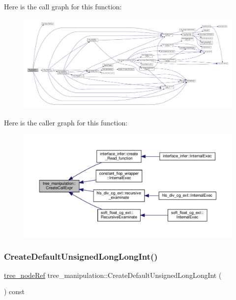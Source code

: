 Here is the call graph for this function\+:
\nopagebreak
\begin{figure}[H]
\begin{center}
\leavevmode
\includegraphics[width=350pt]{d0/d99/classtree__manipulation_aeb47755c334dbaf56f014949d98bcfda_cgraph}
\end{center}
\end{figure}
Here is the caller graph for this function\+:
\nopagebreak
\begin{figure}[H]
\begin{center}
\leavevmode
\includegraphics[width=350pt]{d0/d99/classtree__manipulation_aeb47755c334dbaf56f014949d98bcfda_icgraph}
\end{center}
\end{figure}
\mbox{\label{classtree__manipulation_a2b3e55fe3231ec58b1fc19b969e25166}} 
\subsubsection{\texorpdfstring{Create\+Default\+Unsigned\+Long\+Long\+Int()}{CreateDefaultUnsignedLongLongInt()}}
{\footnotesize\ttfamily \hyperlink{tree__node_8hpp_a6ee377554d1c4871ad66a337eaa67fd5}{tree\+\_\+node\+Ref} tree\+\_\+manipulation\+::\+Create\+Default\+Unsigned\+Long\+Long\+Int (\begin{DoxyParamCaption}{ }\end{DoxyParamCaption}) const}



